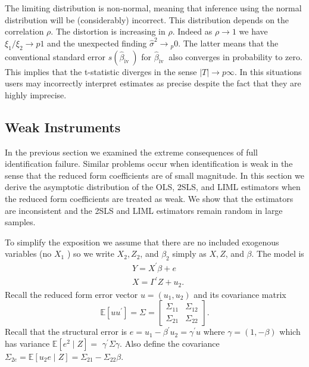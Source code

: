 \documentclass[10pt]{article}
\begin{document}
The limiting distribution is non-normal, meaning that inference using the normal distribution will be (considerably) incorrect. This distribution depends on the correlation $\rho$. The distortion is increasing in $\rho$. Indeed as $\rho \rightarrow 1$ we have $\xi_{1} / \xi_{2} \rightarrow p 1$ and the unexpected finding $\widehat{\sigma}^{2} \rightarrow{ }_{p} 0$. The latter means that the conventional standard error $s\left(\widehat{\beta}_{\text {iv }}\right)$ for $\widehat{\beta}_{\text {iv }}$ also converges in probability to zero. This implies that the t-statistic diverges in the sense $|T| \rightarrow p \infty$. In this situations users may incorrectly interpret estimates as precise despite the fact that they are highly imprecise.

\subsection{Weak Instruments}
In the previous section we examined the extreme consequences of full identification failure. Similar problems occur when identification is weak in the sense that the reduced form coefficients are of small magnitude. In this section we derive the asymptotic distribution of the OLS, 2SLS, and LIML estimators when the reduced form coefficients are treated as weak. We show that the estimators are inconsistent and the 2SLS and LIML estimators remain random in large samples.

To simplify the exposition we assume that there are no included exogenous variables (no $X_{1}$ ) so we write $X_{2}, Z_{2}$, and $\beta_{2}$ simply as $X, Z$, and $\beta$. The model is
$$
\begin{aligned}
&Y=X^{\prime} \beta+e \\
&X=\Gamma^{\prime} Z+u_{2} .
\end{aligned}
$$
Recall the reduced form error vector $u=\left(u_{1}, u_{2}\right)$ and its covariance matrix
$$
\mathbb{E}\left[u u^{\prime}\right]=\Sigma=\left[\begin{array}{cc}
\Sigma_{11} & \Sigma_{12} \\
\Sigma_{21} & \Sigma_{22}
\end{array}\right] .
$$
Recall that the structural error is $e=u_{1}-\beta^{\prime} u_{2}=\gamma^{\prime} u$ where $\gamma=(1,-\beta)$ which has variance $\mathbb{E}\left[e^{2} \mid Z\right]=$ $\gamma^{\prime} \Sigma \gamma$. Also define the covariance $\Sigma_{2 e}=\mathbb{E}\left[u_{2} e \mid Z\right]=\Sigma_{21}-\Sigma_{22} \beta$.
\end{document}
